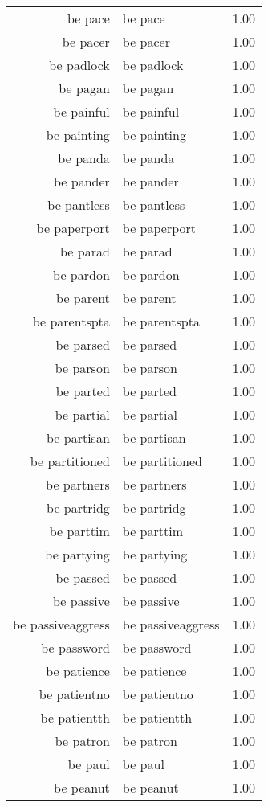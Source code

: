 \begin{table}[ht]
\begin{tabular}{rlr}
  be pace & be pace & 1.00 \\ 
  be pacer & be pacer & 1.00 \\ 
  be padlock & be padlock & 1.00 \\ 
  be pagan & be pagan & 1.00 \\ 
  be painful & be painful & 1.00 \\ 
  be painting & be painting & 1.00 \\ 
  be panda & be panda & 1.00 \\ 
  be pander & be pander & 1.00 \\ 
  be pantless & be pantless & 1.00 \\ 
  be paperport & be paperport & 1.00 \\ 
  be parad & be parad & 1.00 \\ 
  be pardon & be pardon & 1.00 \\ 
  be parent & be parent & 1.00 \\ 
  be parentspta & be parentspta & 1.00 \\ 
  be parsed & be parsed & 1.00 \\ 
  be parson & be parson & 1.00 \\ 
  be parted & be parted & 1.00 \\ 
  be partial & be partial & 1.00 \\ 
  be partisan & be partisan & 1.00 \\ 
  be partitioned & be partitioned & 1.00 \\ 
  be partners & be partners & 1.00 \\ 
  be partridg & be partridg & 1.00 \\ 
  be parttim & be parttim & 1.00 \\ 
  be partying & be partying & 1.00 \\ 
  be passed & be passed & 1.00 \\ 
  be passive & be passive & 1.00 \\ 
  be passiveaggress & be passiveaggress & 1.00 \\ 
  be password & be password & 1.00 \\ 
  be patience & be patience & 1.00 \\ 
  be patientno & be patientno & 1.00 \\ 
  be patientth & be patientth & 1.00 \\ 
  be patron & be patron & 1.00 \\ 
  be paul & be paul & 1.00 \\ 
  be peanut & be peanut & 1.00 \\ 

\end{tabular}
\end{table}
